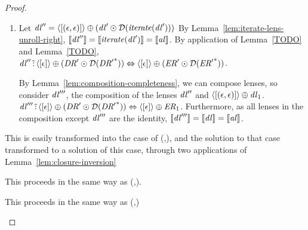 \documentclass[numbers,10pt,preprint\ifanon ,nocopyrightspace\fi]{sigplanconf}
\begin{document}
\begin{proof}
\begin{case}[\AtomUnrollstarLeftRule{},\ParallelAtomStructuralRewriteRule{}]
\begin{enumerate}
    \item
      Let $\mathit{dl}'' = \langle[(\epsilon,\epsilon)]\rangle
      \oplus (\mathit{dl}' \odot \mathcal{D}(\mathit{\mathit{iterate}(\mathit{dl}')}))$
      By Lemma~\ref{lem:iterate-lens-unroll-right},
      $[ \! [\mathit{dl}''] \! ] = [ \! [\mathit{\mathit{iterate}(\mathit{dl}')}] \! ] =
      [ \! [\mathit{al}] \! ]$.
      By application of Lemma~\ref{TODO} and Lemma~\ref{TODO},
      $\mathit{dl}'' \,\tilde{:}\, \langle[\epsilon]\rangle \oplus
      (\mathit{DR}' \odot \mathcal{D}({\mathit{DR}'}^*)) \Leftrightarrow
      \langle[\epsilon]\rangle \oplus
      (\mathit{ER}' \odot \mathcal{D}({\mathit{ER}'}^*))$.
      
      By Lemma~\ref{lem:composition-completeness}, we can compose lenses, so
      consider $\mathit{dl}'''$, the composition of the lenses
      $\mathit{dl}''$ and $\langle[(\epsilon,\epsilon)]\rangle \oplus
      \mathit{dl}_1$.
      $\mathit{dl}''' \,\tilde{:}\, \langle[\epsilon]\rangle \oplus
      (\mathit{DR}' \odot \mathcal{D}({\mathit{DR}'}^*)) \Leftrightarrow
      \langle[\epsilon]\rangle \oplus \mathit{ER}_1$.
      Furthermore, as all lenses in the composition except $\mathit{dl}'''$ are the
      identity, $[ \! [\mathit{dl}'''] \! ] = [ \! [\mathit{dl}] \! ] =
      [ \! [\mathit{al}] \! ]$.
    \end{enumerate}
  \end{case}

  \begin{case}[\AtomUnrollstarRightRule{},\AtomUnrollstarLeftRule{}]
    This is easily transformed into the case of
    (\AtomUnrollstarLeftRule{},\AtomUnrollstarRightRule{}), and the solution to
    that case transformed to a solution of this case, through two applications
    of Lemma~\ref{lem:closure-inversion}
  \end{case}

  \begin{case}[\AtomUnrollstarRightRule{},\AtomUnrollstarRightRule{}]
    This proceeds in the same way as
    (\AtomUnrollstarLeftRule{},\AtomUnrollstarLeftRule{}).
  \end{case}

  \begin{case}[\AtomUnrollstarRightRule{},\ParallelAtomStructuralRewriteRule{}]
    This proceeds in the same way as
    (\AtomUnrollstarLeftRule{},\ParallelAtomStructuralRewriteRule{})
  \end{case}


\end{proof}
\end{document}

